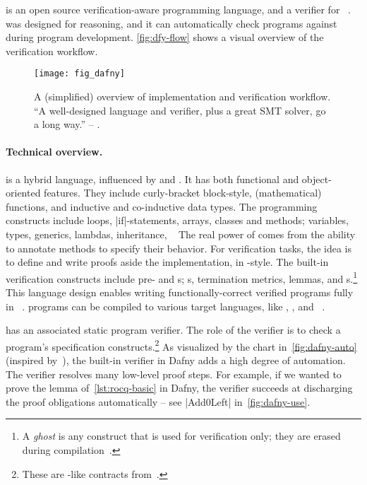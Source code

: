  is an open source verification-aware programming language, and a
verifier for ~\cite{leino2010,dafnylang}.
 was designed for reasoning, and it can automatically check programs
against  during program development. \autoref{fig:dfy-flow}
shows a visual overview of the verification workflow.

\begin{figure}[ht]
\centering
\texttt{[image: fig\_dafny]}
\caption[Overview of Dafny implementation and verification workflow]{
A (simplified) overview of  implementation and verification workflow.
\enquote{A well-designed language and verifier, plus a great SMT solver, go a
long way.} -- \textcite{leino2010b}.}
\label{fig:dfy-flow}
\end{figure}

\paragraph*{Technical overview.}
 is a hybrid language, influenced by  and . It has
both functional and object-oriented features. They include curly-bracket
block-style, (mathematical) functions, and inductive and
co-inductive data types. The programming constructs include
loops, \pr|if|-statements, arrays, classes and methods; variables, types,
generics, lambdas, inheritance, \etc~\cite{dafnydoc} The real power of
 comes from the ability to annotate methods to specify their
behavior. For verification tasks, the idea is to define  and
write proofs aside the implementation, in -style.
The built-in verification constructs include pre- and
s; s, termination metrics, lemmas, and
s.\footnote{A \emph{ghost} is any construct that is used
for verification only; they are erased during compilation~\cite[p.
19]{leino2023}.} This language design enables writing functionally-correct
verified programs fully in ~\cite{leino2023}.  programs
can be compiled to various target languages, like , , and
~\cite{dafnydoc}.

 has an associated static program verifier. The role of the verifier
is to check a program's specification constructs.\footnote{These are
-like contracts from~\cite{meyer1988}.} As visualized by the chart
in~\autoref{fig:dafny-auto} (inspired by~\cite{leino2010b}), the built-in
verifier in Dafny adds a high degree of automation. The verifier resolves many
low-level proof steps. For example, if we wanted to prove the lemma
of~\autoref{lst:rocq-basic} in Dafny, the verifier succeeds at discharging the
proof obligations automatically -- see \pr|Add0Left| in~\autoref{fig:dafny-use}.

